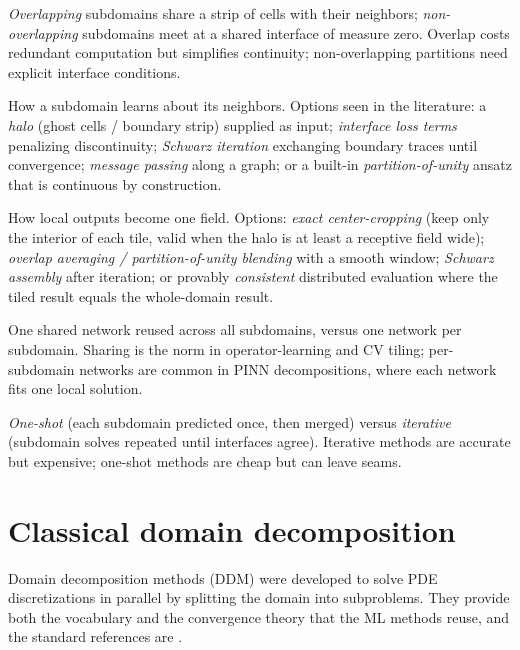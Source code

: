 \documentclass[11pt]{article}
\begin{document}
\begin{description}[leftmargin=1.2em,style=nextline]
\item[Partition geometry.] \emph{Overlapping} subdomains share a strip of cells
with their neighbors; \emph{non-overlapping} subdomains meet at a shared
interface of measure zero. Overlap costs redundant computation but simplifies
continuity; non-overlapping partitions need explicit interface conditions.
\item[Interface information.] How a subdomain learns about its neighbors. Options
seen in the literature: a \emph{halo} (ghost cells / boundary strip) supplied as
input; \emph{interface loss terms} penalizing discontinuity; \emph{Schwarz
iteration} exchanging boundary traces until convergence; \emph{message passing}
along a graph; or a built-in \emph{partition-of-unity} ansatz that is continuous
by construction.
\item[Merging.] How local outputs become one field. Options: \emph{exact
center-cropping} (keep only the interior of each tile, valid when the halo is at
least a receptive field wide); \emph{overlap averaging / partition-of-unity
blending} with a smooth window; \emph{Schwarz assembly} after iteration; or
provably \emph{consistent} distributed evaluation where the tiled result equals
the whole-domain result.
\item[Network sharing.] One shared network reused across all subdomains, versus
one network per subdomain. Sharing is the norm in operator-learning and CV
tiling; per-subdomain networks are common in PINN decompositions, where each
network fits one local solution.
\item[Coupling regime.] \emph{One-shot} (each subdomain predicted once, then
merged) versus \emph{iterative} (subdomain solves repeated until interfaces
agree). Iterative methods are accurate but expensive; one-shot methods are cheap
but can leave seams.
\end{description}

\section{Classical domain decomposition}

Domain decomposition methods (DDM) were developed to solve PDE discretizations
in parallel by splitting the domain into subproblems. They provide both the
vocabulary and the convergence theory that the ML methods reuse, and the
standard references are \cite{toselli2005ddm,quarteroni1999ddm,dolean2015ddm}.
\end{document}
